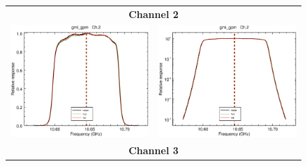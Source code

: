 \begin{figure}[H]
\begin{tabular}{c c}
    \multicolumn{2}{c}{\sffamily\textbf{Channel 2}}\\
    \includegraphics[scale=0.35]{graphics/lin/gmi_gpm-2.eps} &
    \includegraphics[scale=0.35]{graphics/log/gmi_gpm-2.eps} \\
    \multicolumn{2}{c}{\sffamily\textbf{Channel 3}}\\

\end{tabular}
\end{figure}
